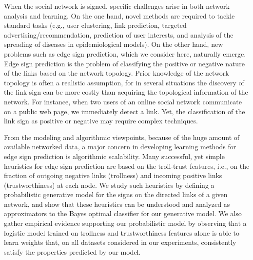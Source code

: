 
When the social network is signed, specific challenges arise in both network analysis and learning.
On the one hand, novel methods are required to tackle standard tasks (e.g., user clustering, link
prediction, targeted advertising/recommendation, prediction of user interests, and analysis of the
spreading of diseases in epidemiological models). On the other hand, new problems such as edge sign
prediction, which we consider here, naturally emerge. Edge sign prediction is the problem of
classifying the positive or negative nature of the links based on the network topology. Prior
knowledge of the network topology is often a realistic assumption, for in several situations the
discovery of the link sign can be more costly than acquiring the topological information of the
network. For instance, when two users of an online social network communicate on a public web page,
we immediately detect a link. Yet, the classification of the link sign as positive or negative may
require complex techniques. 

From the modeling and algorithmic viewpoints, because of the huge amount of available networked
data, a major concern in developing learning methods for edge sign prediction is algorithmic
scalability. Many successful, yet simple heuristics for edge sign prediction are based on the
troll-trust features, i.e., on the fraction of outgoing negative links (trollness) and incoming
positive links (trustworthiness) at each node. We study such heuristics by defining a probabilistic
generative model for the signs on the directed links of a given network, and show that these
heuristics can be understood and analyzed as approximators to the Bayes optimal classifier for our
generative model. We also gather empirical evidence supporting our probabilistic model by observing
that a logistic model trained on trollness and trustworthiness features alone is able to learn
weights that, on all datasets considered in our experiments, consistently satisfy the properties
predicted by our model.

